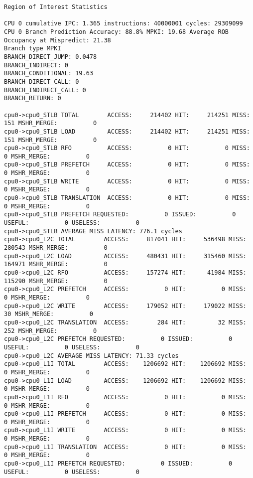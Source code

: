\documentclass[17pt]{article}
\begin{document}
\begin{LTR}
\begin{lstlisting}[basicstyle=\tiny\ttfamily]
Region of Interest Statistics

CPU 0 cumulative IPC: 1.365 instructions: 40000001 cycles: 29309099
CPU 0 Branch Prediction Accuracy: 88.8% MPKI: 19.68 Average ROB Occupancy at Mispredict: 21.38
Branch type MPKI
BRANCH_DIRECT_JUMP: 0.0478
BRANCH_INDIRECT: 0
BRANCH_CONDITIONAL: 19.63
BRANCH_DIRECT_CALL: 0
BRANCH_INDIRECT_CALL: 0
BRANCH_RETURN: 0

cpu0->cpu0_STLB TOTAL        ACCESS:     214402 HIT:     214251 MISS:        151 MSHR_MERGE:          0
cpu0->cpu0_STLB LOAD         ACCESS:     214402 HIT:     214251 MISS:        151 MSHR_MERGE:          0
cpu0->cpu0_STLB RFO          ACCESS:          0 HIT:          0 MISS:          0 MSHR_MERGE:          0
cpu0->cpu0_STLB PREFETCH     ACCESS:          0 HIT:          0 MISS:          0 MSHR_MERGE:          0
cpu0->cpu0_STLB WRITE        ACCESS:          0 HIT:          0 MISS:          0 MSHR_MERGE:          0
cpu0->cpu0_STLB TRANSLATION  ACCESS:          0 HIT:          0 MISS:          0 MSHR_MERGE:          0
cpu0->cpu0_STLB PREFETCH REQUESTED:          0 ISSUED:          0 USEFUL:          0 USELESS:          0
cpu0->cpu0_STLB AVERAGE MISS LATENCY: 776.1 cycles
cpu0->cpu0_L2C TOTAL        ACCESS:     817041 HIT:     536498 MISS:     280543 MSHR_MERGE:          0
cpu0->cpu0_L2C LOAD         ACCESS:     480431 HIT:     315460 MISS:     164971 MSHR_MERGE:          0
cpu0->cpu0_L2C RFO          ACCESS:     157274 HIT:      41984 MISS:     115290 MSHR_MERGE:          0
cpu0->cpu0_L2C PREFETCH     ACCESS:          0 HIT:          0 MISS:          0 MSHR_MERGE:          0
cpu0->cpu0_L2C WRITE        ACCESS:     179052 HIT:     179022 MISS:         30 MSHR_MERGE:          0
cpu0->cpu0_L2C TRANSLATION  ACCESS:        284 HIT:         32 MISS:        252 MSHR_MERGE:          0
cpu0->cpu0_L2C PREFETCH REQUESTED:          0 ISSUED:          0 USEFUL:          0 USELESS:          0
cpu0->cpu0_L2C AVERAGE MISS LATENCY: 71.33 cycles
cpu0->cpu0_L1I TOTAL        ACCESS:    1206692 HIT:    1206692 MISS:          0 MSHR_MERGE:          0
cpu0->cpu0_L1I LOAD         ACCESS:    1206692 HIT:    1206692 MISS:          0 MSHR_MERGE:          0
cpu0->cpu0_L1I RFO          ACCESS:          0 HIT:          0 MISS:          0 MSHR_MERGE:          0
cpu0->cpu0_L1I PREFETCH     ACCESS:          0 HIT:          0 MISS:          0 MSHR_MERGE:          0
cpu0->cpu0_L1I WRITE        ACCESS:          0 HIT:          0 MISS:          0 MSHR_MERGE:          0
cpu0->cpu0_L1I TRANSLATION  ACCESS:          0 HIT:          0 MISS:          0 MSHR_MERGE:          0
cpu0->cpu0_L1I PREFETCH REQUESTED:          0 ISSUED:          0 USEFUL:          0 USELESS:          0

\end{lstlisting}
\end{LTR}
\end{document}
